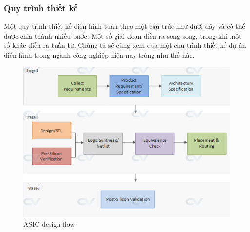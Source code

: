 \documentclass[a4paper]{article}
\begin{document}
\subsubsection{Quy trình thiết kế}
Một quy trình thiết kế điển hình tuân theo một cấu trúc như dưới đây và có thể được chia thành nhiều bước. Một số giai đoạn diễn ra song song, trong khi một số khác diễn ra tuần tự. Chúng ta sẽ cùng xem qua một chu trình thiết kế dự án điển hình trong ngành công nghiệp hiện nay trông như thế nào.
\begin{figure}[H]
    \centering
    \includegraphics[width=0.75\linewidth]{assets/asic-design-flow.png}
    \caption{ASIC design flow}
    \label{fig:enter-label}
\end{figure}
\end{document}
